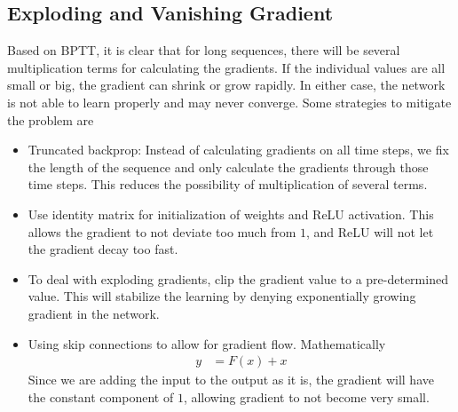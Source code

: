 \documentclass[../../deep_learning_notes.tex]{subfiles}
\begin{document}
\subsection{Exploding and Vanishing Gradient}
Based on BPTT, it is clear that for long sequences, there will be several multiplication terms for calculating the gradients. If the individual values are all small or big, the gradient can shrink or grow rapidly. In either case, the network is not able to learn properly and may never converge. Some strategies to mitigate the problem are
\begin{itemize}
    \item Truncated backprop: Instead of calculating gradients on all time steps, we fix the length of the sequence and only calculate the gradients through those time steps. This reduces the possibility of multiplication of several terms.
    \item Use identity matrix for initialization of weights and ReLU activation. This allows the gradient to not deviate too much from $1$, and ReLU will not let the gradient decay too fast.
    \item To deal with exploding gradients, clip the gradient value to a pre-determined value. This will stabilize the learning by denying exponentially growing gradient in the network.
    \item Using skip connections to allow for gradient flow. Mathematically
    \begin{align*}
        y &= F(x) + x
    \end{align*}
    Since we are adding the input to the output as it is, the gradient will have the constant component of $1$, allowing gradient to not become very small.
\end{itemize}
\end{document}
